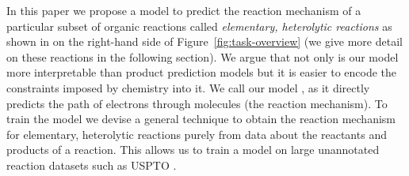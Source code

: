 In this paper we propose a model to predict the reaction mechanism of a particular subset of organic reactions called \emph{elementary, heterolytic reactions} as shown in on the right-hand side of Figure~\ref{fig:task-overview} (we give more detail on these reactions in the following section). We argue that not only is our model more interpretable than product prediction models but it is easier to encode the constraints imposed by chemistry into it. We call our model \ourModel, as it directly predicts the path of electrons through molecules (the reaction mechanism). To train the model we devise a general technique to obtain the reaction mechanism for elementary, heterolytic reactions purely from data about the reactants and products of a reaction. This allows us to train a model on large unannotated reaction datasets such as USPTO \cite{lowe2012extraction}. %



